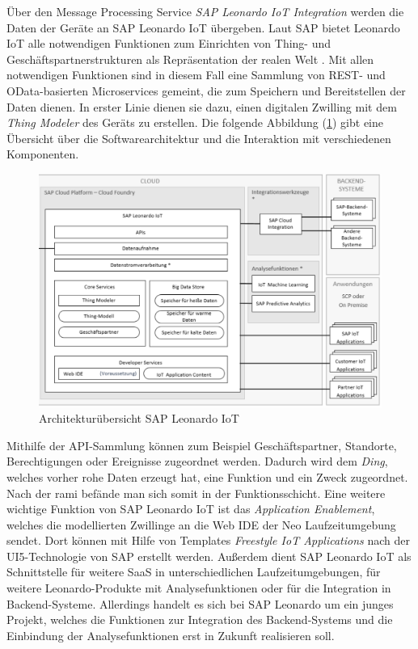 Über den Message Processing Service \textit{SAP Leonardo IoT Integration} werden die Daten der Geräte an SAP Leonardo IoT übergeben. Laut SAP bietet Leonardo IoT \glqq alle notwendigen Funktionen zum Einrichten von Thing- und Geschäftspartnerstrukturen als Repräsentation der realen Welt\grqq{} \citep[S. 11]{SAP2019}. Mit allen notwendigen Funktionen sind in diesem Fall eine Sammlung von REST- und OData-basierten Microservices gemeint, die zum Speichern und Bereitstellen der Daten dienen. In erster Linie dienen sie dazu, einen digitalen Zwilling mit dem \textit{Thing Modeler} des Geräts zu erstellen. Die folgende Abbildung (\ref{leoae}) gibt eine Übersicht über die Softwarearchitektur und die Interaktion mit verschiedenen Komponenten.
\begin{figure}[ht]
  \centering
  \includegraphics[width=1.0\linewidth]{pictures/leo_ae}
  \caption[Architekturübersicht SAP Leonardo IoT]{Architekturübersicht SAP Leonardo IoT \citep[S. 12]{SAP2019}}
  \label{leoae}
\end{figure}
 \noindent Mithilfe der API-Sammlung können zum Beispiel Geschäftspartner, Standorte, Berechtigungen oder Ereignisse zugeordnet werden. Dadurch wird dem \textit{Ding}, welches vorher rohe Daten erzeugt hat, eine Funktion und ein Zweck zugeordnet. Nach der \ac{rami} befände man sich somit in der Funktionsschicht. Eine weitere wichtige Funktion von SAP Leonardo IoT ist das \textit{Application Enablement}, welches die modellierten Zwillinge an die Web IDE der Neo Laufzeitumgebung sendet. Dort können mit Hilfe von Templates \textit{Freestyle IoT Applications} nach der UI5-Technologie von SAP erstellt werden. Außerdem dient SAP Leonardo IoT als Schnittstelle für weitere SaaS in unterschiedlichen Laufzeitumgebungen, für weitere Leonardo-Produkte mit Analysefunktionen oder für die Integration in Backend-Systeme. Allerdings handelt es sich bei SAP Leonardo um ein junges Projekt, welches die Funktionen zur Integration des Backend-Systems und die Einbindung der Analysefunktionen erst in Zukunft realisieren soll.

